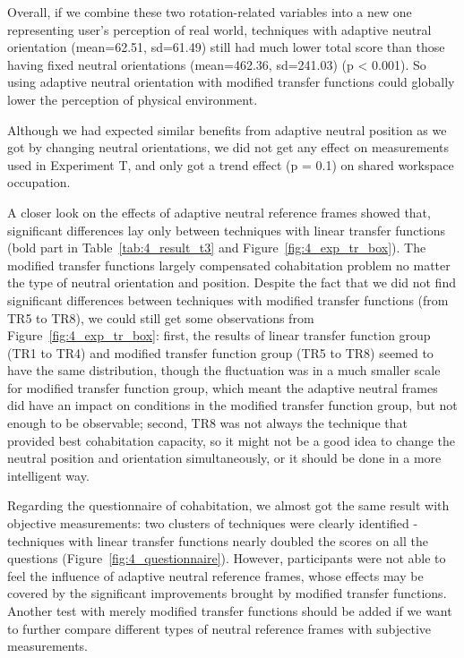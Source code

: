 Overall, if we combine these two rotation-related variables into a new one representing user's perception of real world, techniques with adaptive neutral orientation (mean=62.51, sd=61.49) still had much lower total score than those having fixed neutral orientations (mean=462.36, sd=241.03) (p \textless{} 0.001). So using adaptive neutral orientation with modified transfer functions could globally lower the perception of physical environment.

Although we had expected similar benefits from adaptive neutral position as we got by changing neutral orientations, we did not get any effect on measurements used in Experiment T, and only got a trend effect (p = 0.1) on shared workspace occupation.

A closer look on the effects of adaptive neutral reference frames showed that, significant differences lay only between techniques with linear transfer functions (bold part in Table~\ref{tab:4_result_t3} and Figure~\ref{fig:4_exp_tr_box}). The modified transfer functions largely compensated cohabitation problem no matter the type of neutral orientation and position. Despite the fact that we did not find significant differences between techniques with modified transfer functions (from TR5 to TR8), we could still get some observations from Figure~\ref{fig:4_exp_tr_box}: first, the results of linear transfer function group (TR1 to TR4) and modified transfer function group (TR5 to TR8) seemed to have the same distribution, though the fluctuation was in a much smaller scale for modified transfer function group, which meant the adaptive neutral frames did have an impact on conditions in the modified transfer function group, but not enough to be observable; second, TR8 was not always the technique that provided best cohabitation capacity, so it might not be a good idea to change the neutral position and orientation simultaneously, or it should be done in a more intelligent way.

Regarding the questionnaire of cohabitation, we almost got the same result with objective measurements: two clusters of techniques were clearly identified - techniques with linear transfer functions nearly doubled the scores on all the questions (Figure~\ref{fig:4_questionnaire}). However, participants were not able to feel the influence of adaptive neutral reference frames, whose effects may be covered by the significant improvements brought by modified transfer functions. Another test with merely modified transfer functions should be added if we want to further compare different types of neutral reference frames with subjective measurements.


